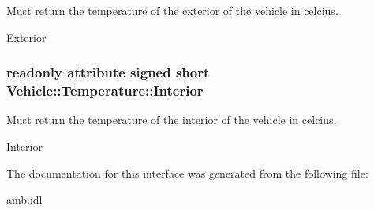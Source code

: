 Must return the temperature of the exterior of the vehicle in celcius. 

Exterior \hypertarget{interfaceVehicle_1_1Temperature_a67733e8d8744450e55018b9ad563d0c7}{
\subsubsection[{Interior}]{\setlength{\rightskip}{0pt plus 5cm}readonly attribute signed short Vehicle\-::\-Temperature\-::\-Interior}}\label{interfaceVehicle_1_1Temperature_a67733e8d8744450e55018b9ad563d0c7}


Must return the temperature of the interior of the vehicle in celcius. 

Interior 

The documentation for this interface was generated from the following file\-:\begin{DoxyCompactItemize}
\item 
amb.\-idl\end{DoxyCompactItemize}
